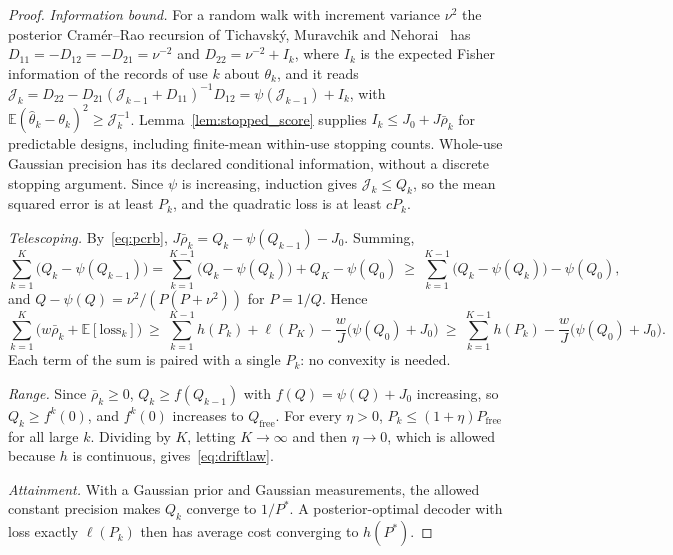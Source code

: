 \documentclass[12pt]{article}
\theoremstyle{definition}
\newcommand{\E}{\mathbb E}
\begin{document}
\begin{proof}
\emph{Information bound.} For a random walk with increment variance $\nu^2$ the posterior Cram\'er--Rao recursion of Tichavsk\'y, Muravchik and Nehorai~\cite{Tichavsky1998} has $D_{11}=-D_{12}=-D_{21}=\nu^{-2}$ and $D_{22}=\nu^{-2}+I_k$, where $I_k$ is the expected Fisher information of the records of use $k$ about $\theta_k$, and it reads $\mathcal J_k=D_{22}-D_{21}(\mathcal J_{k-1}+D_{11})^{-1}D_{12}=\psi(\mathcal J_{k-1})+I_k$, with $\E(\hat\theta_k-\theta_k)^2\ge\mathcal J_k^{-1}$. Lemma~\ref{lem:stopped_score} supplies $I_k\le J_0+J\bar\rho_k$ for predictable designs, including finite-mean within-use stopping counts. Whole-use Gaussian precision has its declared conditional information, without a discrete stopping argument. Since $\psi$ is increasing, induction gives $\mathcal J_k\le Q_k$, so the mean squared error is at least $P_k$, and the quadratic loss is at least $cP_k$.

\emph{Telescoping.} By~\eqref{eq:pcrb}, $J\bar\rho_k=Q_k-\psi(Q_{k-1})-J_0$. Summing,
\[
\sum_{k=1}^K\bigl(Q_k-\psi(Q_{k-1})\bigr)=\sum_{k=1}^{K-1}\bigl(Q_k-\psi(Q_k)\bigr)+Q_K-\psi(Q_0)\ \ge\ \sum_{k=1}^{K-1}\bigl(Q_k-\psi(Q_k)\bigr)-\psi(Q_0),
\]
and $Q-\psi(Q)=\nu^2/(P(P+\nu^2))$ for $P=1/Q$. Hence
\[
\sum_{k=1}^K\bigl(w\bar\rho_k+\E[\mathrm{loss}_k]\bigr)\ \ge\ \sum_{k=1}^{K-1}h(P_k)+\ell(P_K)-\frac wJ\bigl(\psi(Q_0)+J_0\bigr)\ \ge\ \sum_{k=1}^{K-1}h(P_k)-\frac wJ\bigl(\psi(Q_0)+J_0\bigr).
\]
Each term of the sum is paired with a single $P_k$: no convexity is needed.

\emph{Range.} Since $\bar\rho_k\ge0$, $Q_k\ge f(Q_{k-1})$ with $f(Q)=\psi(Q)+J_0$ increasing, so $Q_k\ge f^k(0)$, and $f^k(0)$ increases to $Q_{\mathrm{free}}$. For every $\eta>0$, $P_k\le(1+\eta)P_{\mathrm{free}}$ for all large $k$. Dividing by $K$, letting $K\to\infty$ and then $\eta\to0$, which is allowed because $h$ is continuous, gives~\eqref{eq:driftlaw}.

\emph{Attainment.} With a Gaussian prior and Gaussian measurements, the allowed constant precision makes $Q_k$ converge to $1/P^*$. A posterior-optimal decoder with loss exactly $\ell(P_k)$ then has average cost converging to $h(P^*)$.
\end{proof}
\end{document}
